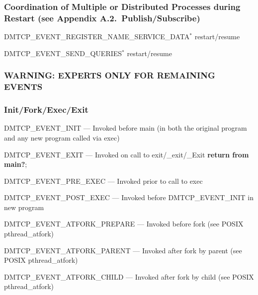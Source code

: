 \documentclass{article}
\begin{document}
\subsubsection*{Coordination of Multiple or Distributed Processes during Restart
	(see Appendix A.2.~Publish/Subscribe)}
\begin{list}{}{\leftmargin=3em \itemindent=-2em}
\item
  DMTCP\_EVENT\_REGISTER\_NAME\_SERVICE\_DATA$^*$ restart/resume
\item
  DMTCP\_EVENT\_SEND\_QUERIES$^*$ restart/resume
\end{list}

\subsubsection*{WARNING:  EXPERTS ONLY FOR REMAINING EVENTS}
\subsubsection*{Init/Fork/Exec/Exit}
\begin{list}{}{\leftmargin=3em \itemindent=-2em}
\item
  DMTCP\_EVENT\_INIT --- Invoked before main (in both the original program
and any new program called via exec)
\item
  DMTCP\_EVENT\_EXIT --- Invoked on call to exit/\_exit/\_Exit {\bf return from main?};
\item
  DMTCP\_EVENT\_PRE\_EXEC --- Invoked prior to call to exec
\item
  DMTCP\_EVENT\_POST\_EXEC --- Invoked before DMTCP\_EVENT\_INIT in new program
\item
  DMTCP\_EVENT\_ATFORK\_PREPARE --- Invoked before fork (see POSIX pthread\_atfork)
\item
  DMTCP\_EVENT\_ATFORK\_PARENT --- Invoked after fork by parent (see POSIX
    pthread\_atfork)
\item
  DMTCP\_EVENT\_ATFORK\_CHILD --- Invoked after fork by child (see POSIX
    pthread\_atfork) \\
\end{list}
\end{document}

